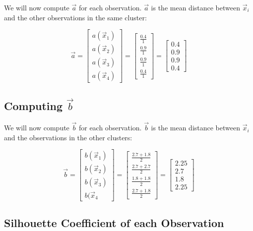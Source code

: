 \documentclass{article}
\begin{document}
We will now compute $\vec{a}$ for each observation. $\vec{a}$ is the mean distance between $\vec{x}_i$ and the other observations in the same cluster:

\[ \vec{a} = \begin{bmatrix} a(\vec{x}_1) \\ a(\vec{x}_2) \\ a(\vec{x}_3) \\ a(\vec{x}_4) \end{bmatrix} = \begin{bmatrix} \frac{0.4}{1} \\ \frac{0.9}{1} \\ \frac{0.9}{1} \\ \frac{0.4}{1} \end{bmatrix} = \begin{bmatrix} 0.4 \\ 0.9 \\ 0.9 \\ 0.4 \end{bmatrix} \]

\subsection*{Computing $\vec{b}$}

We will now compute $\vec{b}$ for each observation. $\vec{b}$ is the mean distance between $\vec{x}_i$ and the observations in the other clusters:

\[ \vec{b} = \begin{bmatrix} b(\vec{x}_1) \\ b(\vec{x}_2) \\ b(\vec{x}_3) \\ b(\vec{x}_4 \end{bmatrix} = \begin{bmatrix} \frac{2.7+1.8}{2} \\ \frac{2.7+2.7}{2} \\ \frac{1.8+1.8}{2} \\ \frac{2.7+1.8}{2} \end{bmatrix} = \begin{bmatrix} 2.25 \\ 2.7 \\ 1.8 \\ 2.25 \end{bmatrix} \]

\subsection*{Silhouette Coefficient of each Observation}
\end{document}
